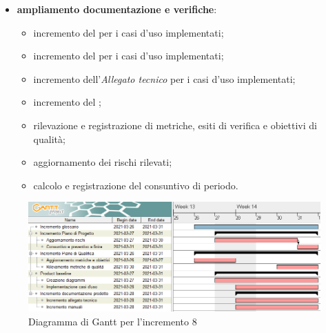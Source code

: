 \begin{itemize}
\item \textbf{ampliamento documentazione e verifiche}:
\begin{itemize}
\item incremento del \textit{\MU{}} per i casi d'uso implementati;
\item incremento del \textit{\MM{}} per i casi d'uso implementati;
\item incremento dell'\textit{Allegato tecnico} per i casi d'uso implementati;
\item incremento del ;
\item rilevazione e registrazione di metriche, esiti di verifica e obiettivi di qualità;
\item aggiornamento dei rischi rilevati;
\item calcolo e registrazione del consuntivo di periodo.
\end{itemize}

\end{itemize}
\begin{figure}[H]
\centering

\centerline{\includegraphics[scale=0.6]{res/Pianificazione/Fasi/CodificaIncrementi/ganttIncremento8}}
\caption{Diagramma di Gantt per l'incremento 8}
\end{figure}